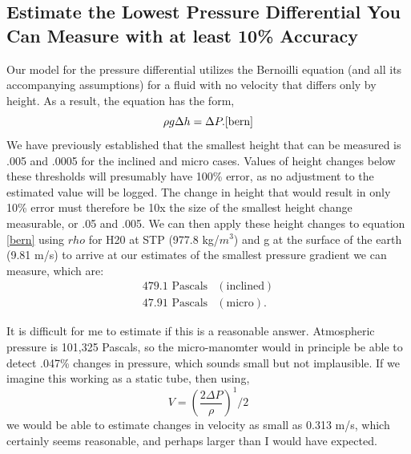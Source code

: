 \documentclass{article}
\begin{document}
\subsection{Estimate the Lowest Pressure Differential You Can Measure
  with at least 10\% Accuracy}

Our model for the pressure differential utilizes the Bernoilli equation
(and all its accompanying assumptions) for a fluid with no velocity that
differs only by height. As a result, the equation has the form,
\begin{equation}
 \rho g \Delta h = \Delta P. 
  \ref{bern}
\end{equation}
We have previously established that the smallest height that can be
measured is .005 and .0005 for the inclined and micro cases. Values of
height changes below these thresholds will presumably have 100\% error,
as no adjustment to the estimated value will be logged. The change in
height that would result in only 10\% error must therefore be 10x the
size of the smallest height change measurable, or .05 and .005. We can
then apply these height changes to equation \ref{bern} using $rho$ for
H20 at STP (977.8 kg/$m^3$) and g at the surface of the earth (9.81 m/s)
to arrive at our estimates of the smallest pressure gradient we can
measure, which are: 
\begin{eqnarray}
 479.1 \text{ Pascals} & (\text{inclined}) \\
 47.91 \text{ Pascals} & (\text{micro}). 
\end{eqnarray}

It is difficult for me to estimate if this is a reasonable
answer. Atmospheric pressure is 101,325 Pascals, so the micro-manomter would in
principle be able to detect .047\% changes in pressure, which sounds
small but not implausible. If we imagine this working as a static tube,
then using,
\begin{equation}
V = \left(\frac{2 \Delta P}{\rho}\right)^1/2
\end{equation}
we would be able to estimate changes in velocity as small as 0.313 m/s,
which certainly seems reasonable, and perhaps larger than I would have
expected. 
\end{document}
